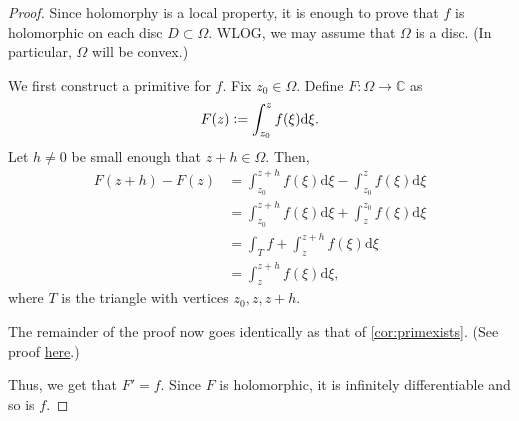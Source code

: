 \morera*\label{thm:morera2}
\begin{flushright}\hyperref[thm:morera]{\upsym}\end{flushright}
\begin{proof}
	Since holomorphy is a local property, it is enough to prove that $f$ is holomorphic on each disc $D \subset \Omega.$ WLOG, we may assume that $\Omega$ is a disc. (In particular, $\Omega$ will be convex.)

	We first construct a primitive for $f.$ Fix $z_0 \in \Omega.$ Define $F:\Omega \to \mathbb{C}$ as
	\begin{equation*} 
		F(z) \vcentcolon= \int_{z_0}^{z} f(\xi) \mathrm{d}\xi.
	\end{equation*}
	Let $h \neq 0$ be small enough that $z + h \in \Omega.$ Then,
	\begin{align*} 
		F(z+h) - F(z) &= \int_{z_0}^{z+h} f(\xi) \mathrm{d}\xi - \int_{z_0}^{z} f(\xi) \mathrm{d}\xi\\
		&= \int_{z_0}^{z+h} f(\xi) \mathrm{d}\xi + \int_{z}^{z_0} f(\xi) \mathrm{d}\xi\\
		&= \int_T f + \int_{z}^{z+h} f(\xi) \mathrm{d}\xi\\
		&= \int_{z}^{z+h} f(\xi) \mathrm{d}\xi,
	\end{align*}
	where $T$ is the triangle with vertices $z_0, z, z+h.$

	The remainder of the proof now goes identically as that of \cref{cor:primexists}. (See proof \hyperref[cor:primexists2]{here}.)

	Thus, we get that $F' = f.$ Since $F$ is holomorphic, it is infinitely differentiable and so is $f.$
\end{proof}



